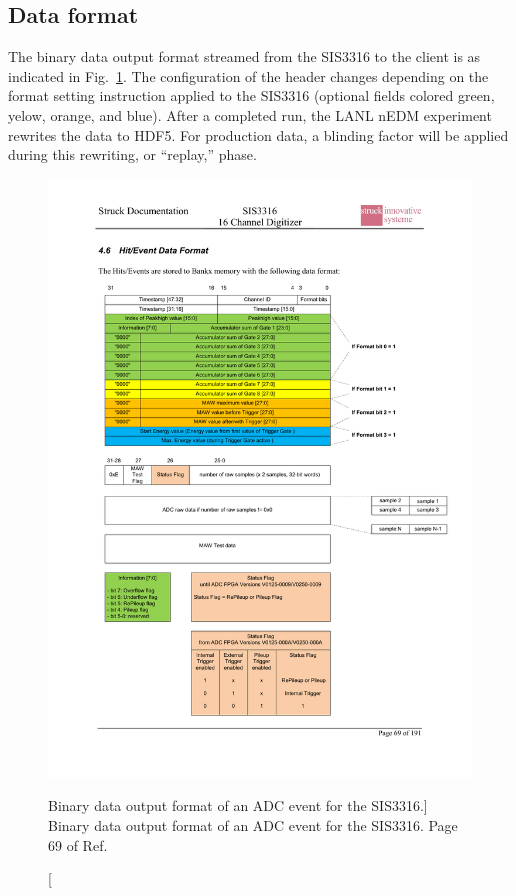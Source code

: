 
\subsection{Data format}\label{sec:sis3316_data_format}


The binary data output format streamed from the SIS3316 to the client is as indicated in Fig.~\ref{fig:sis3316_raw_data}. The configuration of the header changes depending on the format setting instruction applied to the SIS3316 (optional fields colored green, yelow, orange, and blue). After a completed run, the LANL nEDM experiment rewrites the data to HDF5. For production data, a blinding factor will be applied during this rewriting, or ``replay,'' phase. 


\begin{figure}
    \centering
    \includegraphics[height=0.9\textheight]{figures/sis3316_raw_data.pdf}
    \caption
    [Binary data output format of an ADC event for the SIS3316.]
     {Binary data output format of an ADC event for the SIS3316. Page 69 of Ref.~\cite{sis3316_manual}}
    \label{fig:sis3316_raw_data}
\end{figure}


